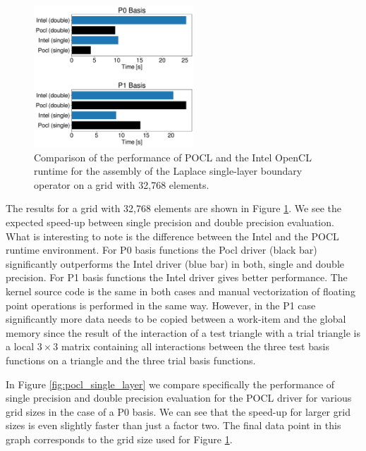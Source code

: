 \begin{figure}
	\center
	\includegraphics[width=6cm]{img/intel_pocl_laplace_comp.pdf}
	\caption{Comparison of the performance of POCL and the Intel OpenCL runtime for the assembly of the Laplace single-layer boundary operator on a grid with 32,768 elements.}
	\label{fig:intel_pocl_laplace_cmp}
\end{figure}

The results for a grid with 32,768 elements are shown in Figure \ref{fig:intel_pocl_laplace_cmp}. We see the expected speed-up between single precision and double precision evaluation. What is interesting to note is the difference between the Intel and the POCL runtime environment. For P0 basis functions the Pocl driver (black bar) significantly outperforms the Intel driver (blue bar) in both, single and double precision. For P1 basis functions the Intel driver gives better performance. The kernel source code is the same in both cases and manual vectorization of floating point operations is performed in the same way. However, in the P1 case significantly more data needs to be copied between a work-item and the global memory since the result of the interaction of a test triangle with a trial triangle is a local $3\times 3$ matrix containing all interactions between the three test basis functions on a triangle and the three trial basis functions. 

In Figure \ref{fig:pocl_single_layer} we compare specifically the performance of single precision and double precision evaluation for the POCL driver for various grid sizes in the case of a P0 basis. We can see that the speed-up for larger grid sizes is even slightly faster than just a factor two. The final data point in this graph corresponds to the grid size used for Figure \ref{fig:intel_pocl_laplace_cmp}.


